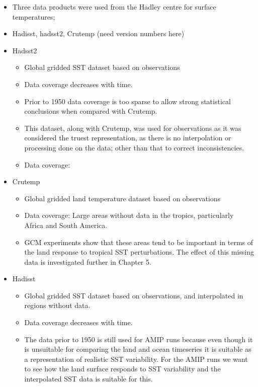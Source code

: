 \begin{itemize}
	\item Three data products were used from the Hadley centre for surface 
		temperatures;
	\item Hadisst, hadsst2, Crutemp (need version numbers here)
	\item Hadsst2
	\begin{itemize}
		\item Global gridded SST dataset based on observations
		\item Data coverage decreases with time.
		\item Prior to 1950 data coverage is too sparse to allow strong 
			statistical conclusions \citep{Dommenget2009} when compared with 
			Crutemp.
		\item This dataset, along with Crutemp, was used for observations as it 
			was considered the truest representation, as there is no 
			interpolation or processing done on the data; other than that to 
			correct inconsistencies.
		\item Data coverage:
	\end{itemize}
	\item Crutemp
	\begin{itemize}
		\item Global gridded land temperature dataset based on observations
		\item Data coverage: Large areas without data in the tropics, particularly Africa and South America.
		\item GCM experiments show that these areas tend to be important in 
	terms of the land response to tropical SST perturbations. The effect of this 
	missing data is investigated further in Chapter 5.
	\end{itemize}
	\item Hadisst
	\begin{itemize}
		\item Global gridded SST dataset based on observations, and interpolated in regions without data.
		\item Data coverage decreases with time.
		\item The data prior to 1950 is still used for AMIP runs because even 
			though it is unsuitable for comparing the land and ocean timeseries	
			it is suitable as a representation of realistic SST variability. For 
			the AMIP runs we want to see how the land surface responds to SST 
			variability and the interpolated SST data is suitable for this.
	\end{itemize}
\end{itemize}

